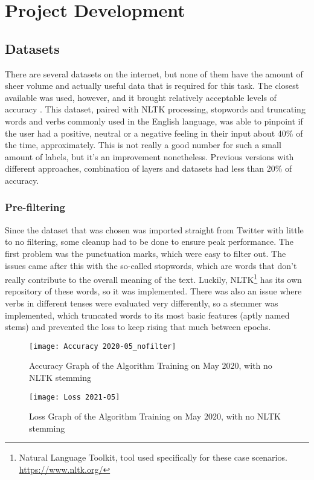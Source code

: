 \chapter{Project Development}

\section{Datasets}
There are several datasets on the internet, but none of them have the amount of sheer volume and actually useful data that is required for this task. The closest available was used, however, and it brought relatively acceptable levels of accuracy \citep{rf7}.
This dataset, paired with NLTK processing, stopwords and truncating words and verbs commonly used in the English language, was able to pinpoint if the user had a positive, neutral or a negative feeling in their input about 40\% of the time, approximately.
This is not really a good number for such a small amount of labels, but it's an improvement nonetheless. Previous versions with different approaches, combination of layers and datasets had less than 20\% of accuracy.
\pagebreak

\subsection{Pre-filtering}
Since the dataset that was chosen was imported straight from Twitter with little to no filtering, some cleanup had to be done to ensure peak performance.
The first problem was the punctuation marks, which were easy to filter out. The issues came after this with the so-called stopwords, which are words that don't really contribute to the overall meaning of the text. Luckily, NLTK\footnote{Natural Language Toolkit, tool used specifically for these case scenarios. \url{https://www.nltk.org/}} has its own repository of these words, so it was implemented. There was also an issue where verbs in different tenses were evaluated very differently, so a  stemmer was implemented, which truncated words to its most basic features (aptly named stems) and prevented the loss to keep rising that much between epochs.
\pagebreak
\begin{figure}[!h]
	\centering
	\texttt{[image: Accuracy 2020-05\_nofilter]}
	\caption{Accuracy Graph of the Algorithm Training on May 2020, with no NLTK stemming}
	\label{fig:accuracy2020_nofilter}
	\texttt{[image: Loss 2021-05]}
	\caption{Loss Graph of the Algorithm Training on May 2020, with no NLTK stemming}
	\label{fig:loss2020_nofilter}
\end{figure}

